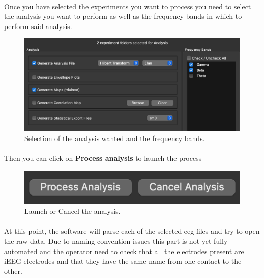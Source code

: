 \documentclass[a4paper]{article}
\begin{document}
\paragraph{} Once you have selected the experiments you want to process you need to select the analysis you want to perform as well as the frequency bands in which to perform said analysis.
\begin{figure}[H]
\begin{center}
\includegraphics[scale=0.6]{AnalysisOptions.png}
\end{center}
\caption{\label{BidsSubjectAnalysisOptionsUI}Selection of the analysis wanted and the frequency bands.}
\end{figure}

\paragraph{} Then you can click on \textbf{Process analysis} to launch the process
\begin{figure}[H]
\begin{center}
\includegraphics[scale=0.6]{ProcessCancel.png}
\end{center}
\caption{\label{RunAnalysisBidsSubjectUI}Launch or Cancel the analysis.}
\end{figure}

\paragraph{} At this point, the software will parse each of the selected eeg files and try to open the raw data. Due to naming convention issues this part is not yet fully automated and the operator need to check that all the electrodes present are iEEG electrodes and that they have the same name from one contact to the other. 
\end{document}
